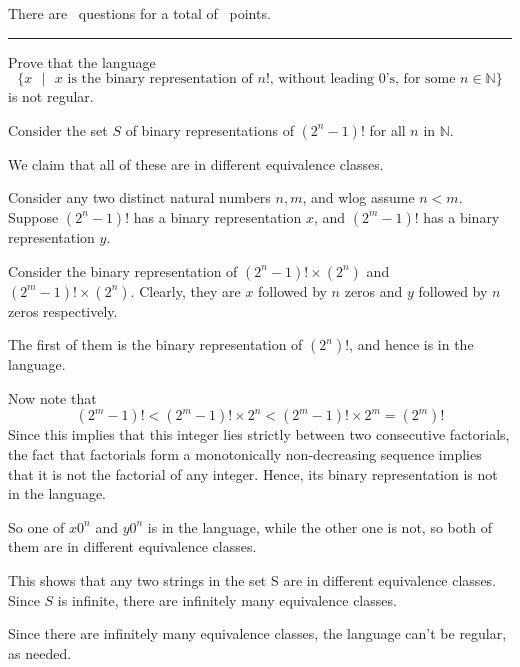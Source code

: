\documentclass[answers]{exam}
\newcommand{\mb}{\mathbb}
\begin{document}
\vspace{0.1in}

\vspace{0.1in}
There are \numquestions\, questions for a total of \numpoints\, points.
\vspace{0.1in}
\hrule
\vspace{0.2in}
\begin{questions}

    \question[5]

    Prove that the language 
    \[
        \{x\text{ }|\text{ }x\text{ is the binary representation of }n!\text{, without leading 0's, for some }n\in\mathbb{N}\}
    \]
    is not regular.

    \begin{solution}
        Consider the set $S$ of binary representations of $(2^n - 1)!$ for all $n$ in $\mb{N}$.

        We claim that all of these are in different equivalence classes.

        Consider any two distinct natural numbers $n, m$, and wlog assume $n < m$. Suppose $(2^n - 1)!$ has a binary representation $x$, and $(2^m - 1)!$ has a binary representation $y$.

        Consider the binary representation of $(2^n - 1)! \times (2^n)$ and $(2^m - 1)! \times (2^n)$. Clearly, they are $x$ followed by $n$ zeros and $y$ followed by $n$ zeros respectively.

        The first of them is the binary representation of $(2^n)!$, and hence is in the language.

        Now note that
        \[
            (2^m - 1)! < (2^m - 1)! \times 2^n < (2^m - 1)! \times 2^m = (2^m)!
        \]
        Since this implies that this integer lies strictly between two consecutive factorials, the fact that factorials form a monotonically non-decreasing sequence implies that it is not the factorial of any integer. Hence, its binary representation is not in the language.

        So one of $x0^n$ and $y0^n$ is in the language, while the other one is not, so both of them are in different equivalence classes.

        This shows that any two strings in the set S are in different equivalence classes. Since $S$ is infinite, there are infinitely many equivalence classes.

        Since there are infinitely many equivalence classes, the language can't be regular, as needed.
    \end{solution}


\end{questions}
\end{document}
